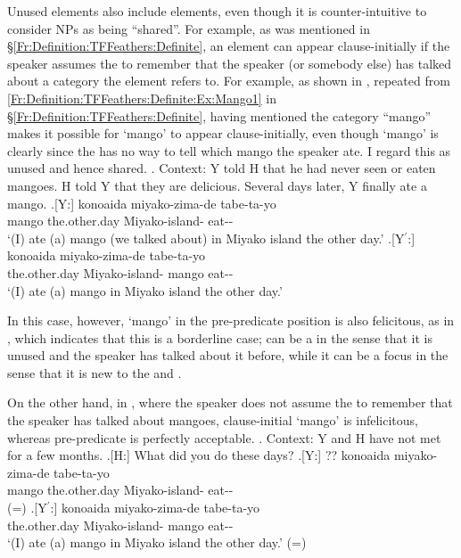 Unused elements also include  elements, even though it is counter-intuitive to consider  NPs as being ``shared''.
For example, as was mentioned in \S \ref{Fr:Definition:TFFeathers:Definite},
an  element can appear clause-initially
if the speaker assumes the  to remember that the speaker (or somebody else) has talked about a category the element refers to.
For example, as shown in \Next[Y],
repeated from \ref{Fr:Definition:TFFeathers:Definite:Ex:Mango1} in \S \ref{Fr:Definition:TFFeathers:Definite},
having mentioned the category ``mango'' makes it possible for  `mango' to appear clause-initially, even though  `mango' is clearly 
since the  has no way to tell which mango the speaker ate. I regard this as unused and hence shared.
%
\ex. Context:
	Y told H that he had never seen or eaten mangoes.
	H told Y that they are delicious.
	Several days later, Y finally ate a mango.
	\ag.[Y:]  konoaida miyako-zima-de tabe-ta-yo \\
			mango the.other.day Miyako-island- eat-- \\
			`(I) ate (a) mango (we talked about) in Miyako island the other day.'
	\bg.[Y$^{\prime}$:] konoaida miyako-zima-de  tabe-ta-yo \\
			the.other.day Miyako-island- mango eat-- \\
			`(I) ate (a) mango in Miyako island the other day.'

In this case, however,
 `mango' in the pre-predicate position is also felicitous,
as in \Last[Y$^{\prime}$],
which indicates that this is a borderline case;
 can be a  in the sense that
it is unused and the speaker has talked about it before,
while it can be a focus in the sense that
it is new to the  and .

On the other hand, in \Next[Y],
where the speaker does not assume the  to remember that
the speaker has talked about mangoes,
clause-initial  `mango' is infelicitous,
whereas pre-predicate  is perfectly acceptable.
%
\ex. Context:
	Y and H have not met for a few months.
	\a.[H:] What did you do these days?
	\bg.[Y:] ?? konoaida miyako-zima-de tabe-ta-yo \\
			mango the.other.day Miyako-island- eat-- \\
		\hfill(=\LLast[Y])
	\bg.[Y$^{\prime}$:] konoaida miyako-zima-de  tabe-ta-yo \\
			the.other.day Miyako-island- mango eat-- \\
			`(I) ate (a) mango in Miyako island the other day.'
		\hfill(=\LLast[Y$^{\prime}$])

